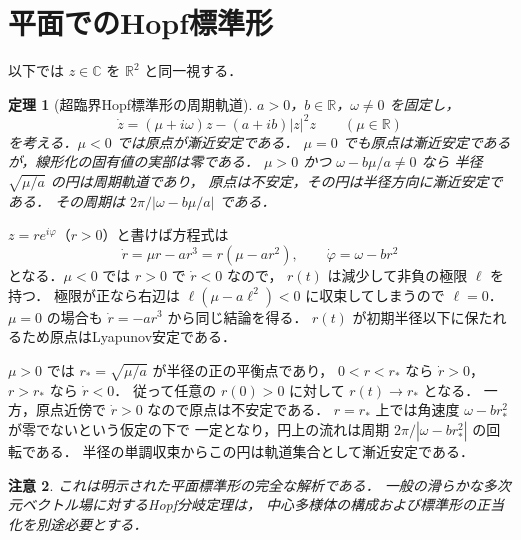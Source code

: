 \documentclass[a5paper,10pt,onecolumn]{jsarticle}
\makeatletter
\theoremstyle{mathnotetheorem}
\newtheorem{theorem}{定理}[section]
\newtheorem{remark}[theorem]{注意}
\renewcommand{\proofname}{証明}
\renewenvironment{proof}[1][\proofname]{%
  \par\pushQED{\qed}\normalfont\topsep4\p@\@plus2\p@\relax
  \trivlist\item[\hskip\labelsep\bfseries #1]\ignorespaces
}{\popQED\endtrivlist\@endpefalse}
\makeatother
\begin{document}
\section{平面でのHopf標準形}
以下では $z\in\mathbb C$ を $\mathbb R^2$ と同一視する．
\begin{theorem}[超臨界Hopf標準形の周期軌道]
$a>0$，$b\in\mathbb R$，$\omega\ne0$ を固定し，
\[
 \dot z=(\mu+i\omega)z-(a+ib)|z|^2z
 \qquad(\mu\in\mathbb R)
\]
を考える．$\mu<0$ では原点が漸近安定である．
$\mu=0$ でも原点は漸近安定であるが，線形化の固有値の実部は零である．
$\mu>0$ かつ $\omega-b\mu/a\ne0$ なら
半径 $\sqrt{\mu/a}$ の円は周期軌道であり，
原点は不安定，その円は半径方向に漸近安定である．
その周期は $2\pi/|\omega-b\mu/a|$ である．
\end{theorem}
\begin{proof}
$z=re^{i\varphi}$（$r>0$）と書けば方程式は
\[
 \dot r=\mu r-ar^3=r(\mu-ar^2),\qquad
 \dot\varphi=\omega-br^2
\]
となる．$\mu<0$ では $r>0$ で $\dot r<0$ なので，
$r(t)$ は減少して非負の極限 $\ell$ を持つ．
極限が正なら右辺は $\ell(\mu-a\ell^2)<0$ に収束してしまうので
$\ell=0$．$\mu=0$ の場合も $\dot r=-ar^3$ から同じ結論を得る．
$r(t)$ が初期半径以下に保たれるため原点はLyapunov安定である．

$\mu>0$ では $r_*=\sqrt{\mu/a}$ が半径の正の平衡点であり，
$0<r<r_*$ なら $\dot r>0$，$r>r_*$ なら $\dot r<0$．
従って任意の $r(0)>0$ に対して $r(t)\to r_*$ となる．
一方，原点近傍で $\dot r>0$ なので原点は不安定である．
$r=r_*$ 上では角速度 $\omega-br_*^2$ が零でないという仮定の下で
一定となり，円上の流れは周期
$2\pi/|\omega-br_*^2|$ の回転である．
半径の単調収束からこの円は軌道集合として漸近安定である．
\end{proof}
\begin{remark}
これは明示された平面標準形の完全な解析である．
一般の滑らかな多次元ベクトル場に対するHopf分岐定理は，
中心多様体の構成および標準形の正当化を別途必要とする．
\end{remark}
\end{document}
